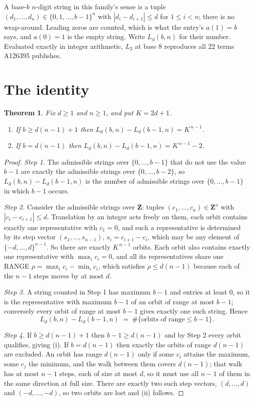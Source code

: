 \documentclass[11pt,a4paper]{article}
\theoremstyle{plain}
\newtheorem{theorem}{Theorem}
\theoremstyle{definition}
\begin{document}
A base-$b$ $n$-digit string in this family's sense is a tuple
$(d_1,\dots,d_n)\in\{0,1,\dots,b-1\}^{n}$ with $|d_i-d_{i+1}|\le d$ for $1\le i<n$; there
is no wrap-around. Leading zeros are counted, which is what the entry's $a(1)=b$ says, and
$a(0)=1$ is the empty string. Write $L_d(b,n)$ for their number. Evaluated exactly in integer
arithmetic, $L_{2}$ at base $8$ reproduces all $22$ terms A126395 publishes.

\section{The identity}

\begin{theorem}
Fix $d\ge1$ and $n\ge1$, and put $K=2d+1$.
\begin{enumerate}
\item[(i)] If $b\ge d(n-1)+1$ then $L_d(b,n)-L_d(b-1,n)=K^{\,n-1}$.
\item[(ii)] If $b=d(n-1)$ then $L_d(b,n)-L_d(b-1,n)=K^{\,n-1}-2$.
\end{enumerate}
\end{theorem}

\begin{proof}
\emph{Step 1.} The admissible strings over $\{0,\dots,b-1\}$ that do not use the value $b-1$
are exactly the admissible strings over $\{0,\dots,b-2\}$, so $L_d(b,n)-L_d(b-1,n)$ is the
number of admissible strings over $\{0,\dots,b-1\}$ in which $b-1$ occurs.

\emph{Step 2.} Consider the admissible strings over $\mathbf{Z}$: tuples
$(c_1,\dots,c_n)\in\mathbf{Z}^{n}$ with $|c_i-c_{i+1}|\le d$. Translation by an integer acts
freely on them, each orbit contains exactly one representative with $c_1=0$, and such a
representative is determined by its step vector $(s_1,\dots,s_{n-1})$, $s_i=c_{i+1}-c_i$,
which may be any element of $\{-d,\dots,d\}^{n-1}$. So there are exactly $K^{\,n-1}$ orbits.
Each orbit also contains exactly one representative with $\max_i c_i=0$, and all its
representatives share one RANGE $\rho=\max_ic_i-\min_ic_i$, which satisfies
$\rho\le d(n-1)$ because each of the $n-1$ steps moves by at most $d$.

\emph{Step 3.} A string counted in Step 1 has maximum $b-1$ and entries at least $0$, so it is
the representative with maximum $b-1$ of an orbit of range at most $b-1$; conversely every orbit
of range at most $b-1$ gives exactly one such string. Hence
\[
L_d(b,n)-L_d(b-1,n)\;=\;\#\{\text{orbits of range}\le b-1\} .
\]

\emph{Step 4.} If $b\ge d(n-1)+1$ then $b-1\ge d(n-1)$ and by Step 2 every orbit qualifies,
giving (i). If $b=d(n-1)$ then exactly the orbits of range $d(n-1)$ are excluded. An orbit has
range $d(n-1)$ only if some $c_i$ attains the maximum, some $c_j$ the minimum, and the walk
between them covers $d(n-1)$; that walk has at most $n-1$ steps, each of size at most $d$, so it
must use all $n-1$ of them in the same direction at full size. There are exactly two such step
vectors, $(d,\dots,d)$ and $(-d,\dots,-d)$, so two orbits are lost and (ii) follows.
\end{proof}
\end{document}

